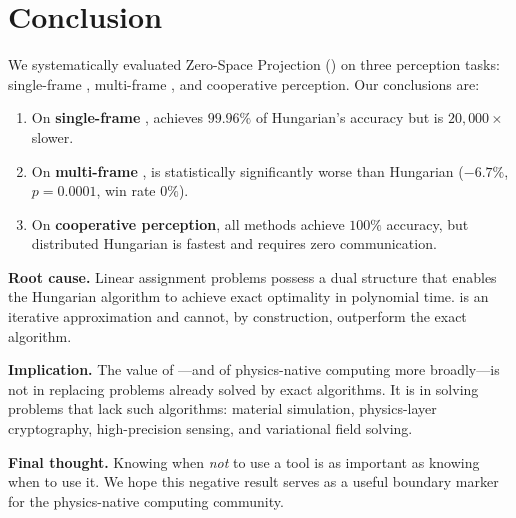 \section{Conclusion}
\label{sec:conclusion}

We systematically evaluated Zero-Space Projection (\ZSP) on three 
perception tasks: single-frame \MOT, multi-frame \MOT, and 
cooperative perception. Our conclusions are:

\begin{enumerate}[leftmargin=*]
    \item On \textbf{single-frame \MOT}, \ZSP achieves $99.96\%$ of 
          Hungarian's accuracy but is $20{,}000\times$ slower.
    \item On \textbf{multi-frame \MOT}, \ZSP is statistically 
          significantly worse than Hungarian ($-6.7\%$, $p=0.0001$, 
          win rate $0\%$).
    \item On \textbf{cooperative perception}, all methods achieve 
          $100\%$ accuracy, but distributed Hungarian is fastest and 
          requires zero communication.
\end{enumerate}

\textbf{Root cause.} Linear assignment problems possess a dual 
structure that enables the Hungarian algorithm to achieve exact 
optimality in polynomial time. \ZSP is an iterative approximation 
and cannot, by construction, outperform the exact algorithm.

\textbf{Implication.} The value of \ZSP---and of physics-native 
computing more broadly---is not in replacing problems already 
solved by exact algorithms. It is in solving problems that lack 
such algorithms: material simulation, physics-layer cryptography, 
high-precision sensing, and variational field solving.

\textbf{Final thought.} Knowing when \emph{not} to use a tool is 
as important as knowing when to use it. We hope this negative 
result serves as a useful boundary marker for the physics-native 
computing community.